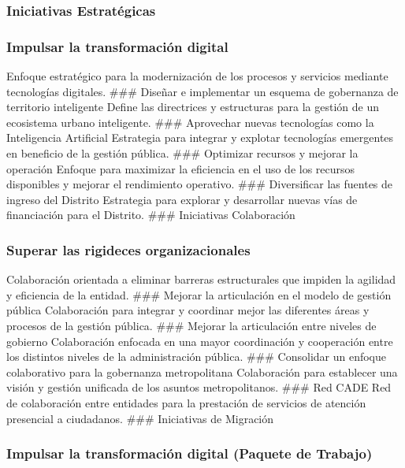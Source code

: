 \documentclass[
	a4paper, %
	12pt, %
]{include/CSSullivanBusinessReport}
\begin{document}
\subsubsection{Iniciativas
Estratégicas}\label{sec:iniciativas-estratuxe9gicas}

\subsubsection{Impulsar la transformación
digital}\label{sec:impulsar-la-transformaciuxf3n-digital}

Enfoque estratégico para la modernización de los procesos y servicios
mediante tecnologías digitales. \#\#\# Diseñar e implementar un esquema
de gobernanza de territorio inteligente Define las directrices y
estructuras para la gestión de un ecosistema urbano inteligente. \#\#\#
Aprovechar nuevas tecnologías como la Inteligencia Artificial Estrategia
para integrar y explotar tecnologías emergentes en beneficio de la
gestión pública. \#\#\# Optimizar recursos y mejorar la operación
Enfoque para maximizar la eficiencia en el uso de los recursos
disponibles y mejorar el rendimiento operativo. \#\#\# Diversificar las
fuentes de ingreso del Distrito Estrategia para explorar y desarrollar
nuevas vías de financiación para el Distrito. \#\#\# Iniciativas
Colaboración

\subsubsection{Superar las rigideces
organizacionales}\label{sec:superar-las-rigideces-organizacionales}

Colaboración orientada a eliminar barreras estructurales que impiden la
agilidad y eficiencia de la entidad. \#\#\# Mejorar la articulación en
el modelo de gestión pública Colaboración para integrar y coordinar
mejor las diferentes áreas y procesos de la gestión pública. \#\#\#
Mejorar la articulación entre niveles de gobierno Colaboración enfocada
en una mayor coordinación y cooperación entre los distintos niveles de
la administración pública. \#\#\# Consolidar un enfoque colaborativo
para la gobernanza metropolitana Colaboración para establecer una visión
y gestión unificada de los asuntos metropolitanos. \#\#\# Red CADE Red
de colaboración entre entidades para la prestación de servicios de
atención presencial a ciudadanos. \#\#\# Iniciativas de Migración

\subsubsection{Impulsar la transformación digital (Paquete de
Trabajo)}\label{sec:impulsar-la-transformaciuxf3n-digital-paquete-de-trabajo}
\end{document}

